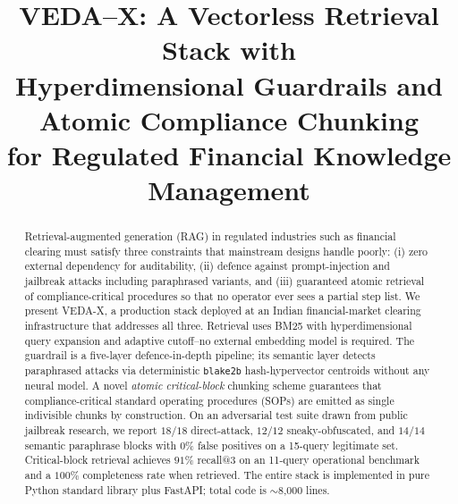 \documentclass[conference]{IEEEtran}
\begin{document}
\title{VEDA--X: A Vectorless Retrieval Stack with\\
Hyperdimensional Guardrails and Atomic Compliance Chunking\\
for Regulated Financial Knowledge Management}

\author{
}

\maketitle

\begin{abstract}
Retrieval-augmented generation (RAG) in regulated industries such as
financial clearing must satisfy three constraints that mainstream
designs handle poorly: (i) zero external dependency for auditability,
(ii) defence against prompt-injection and jailbreak attacks including
paraphrased variants, and (iii) guaranteed atomic retrieval of
compliance-critical procedures so that no operator ever sees a
partial step list.  We present \textsc{VEDA-X}, a production stack
deployed at an Indian financial-market clearing infrastructure that
addresses all three.  Retrieval uses BM25 with hyperdimensional
query expansion and adaptive cutoff--no external embedding model is
required.  The guardrail is a five-layer defence-in-depth pipeline;
its semantic layer detects paraphrased attacks via deterministic
\texttt{blake2b} hash-hypervector centroids without any neural model.
A novel \emph{atomic critical-block} chunking scheme guarantees that
compliance-critical standard operating procedures (SOPs) are emitted
as single indivisible chunks by construction.  On an adversarial test
suite drawn from public jailbreak research, we report
$18/18$ direct-attack, $12/12$ sneaky-obfuscated, and $14/14$ semantic
paraphrase blocks with $0\%$ false positives on a 15-query legitimate
set.  Critical-block retrieval achieves $91\%$ recall@3 on an
11-query operational benchmark and a $100\%$ completeness rate when
retrieved.  The entire stack is implemented in pure Python standard
library plus FastAPI; total code is $\sim$8{,}000 lines.
\end{abstract}
\end{document}
